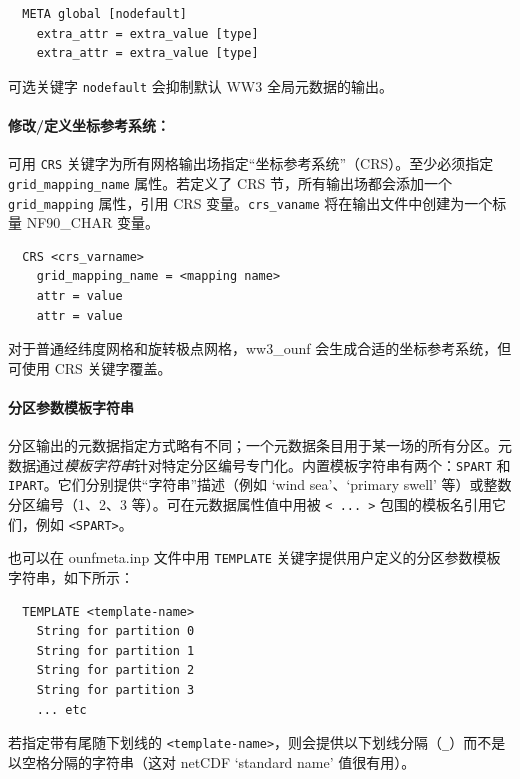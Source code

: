 \begin{verbatim}
  META global [nodefault]
    extra_attr = extra_value [type]
    extra_attr = extra_value [type]
\end{verbatim}

\noindent
可选关键字 \texttt{nodefault} 会抑制默认 WW3 全局元数据的输出。

\noindent
\paragraph{修改/定义坐标参考系统：}


\noindent
可用 \texttt{CRS} 关键字为所有网格输出场指定“坐标参考系统”（CRS）。至少必须指定 \texttt{grid\_mapping\_name} 属性。若定义了 CRS 节，所有输出场都会添加一个 \texttt{grid\_mapping} 属性，引用 CRS 变量。\texttt{crs\_vaname} 将在输出文件中创建为一个标量 NF90\_CHAR 变量。

\begin{verbatim}
  CRS <crs_varname>
    grid_mapping_name = <mapping name>
    attr = value
    attr = value
\end{verbatim}

\noindent
对于普通经纬度网格和旋转极点网格，ww3\_ounf 会生成合适的坐标参考系统，但可使用 CRS 关键字覆盖。


\noindent
\paragraph{分区参数模板字符串}

\noindent
分区输出的元数据指定方式略有不同；一个元数据条目用于某一场的所有分区。元数据通过\emph{模板字符串}针对特定分区编号专门化。内置模板字符串有两个：\texttt{SPART} 和 \texttt{IPART}。它们分别提供“字符串”描述（例如 `wind sea'、`primary swell' 等）或整数分区编号（1、2、3 等）。可在元数据属性值中用被 \texttt{< ... >} 包围的模板名引用它们，例如 \texttt{<SPART>}。

\noindent
也可以在 ounfmeta.inp 文件中用 \texttt{TEMPLATE} 关键字提供用户定义的分区参数模板字符串，如下所示：

\begin{verbatim}
  TEMPLATE <template-name>
    String for partition 0
    String for partition 1
    String for partition 2
    String for partition 3
    ... etc
\end{verbatim}

\noindent
若指定带有尾随下划线的 \texttt{<template-name>}，则会提供以下划线分隔（\texttt{\_}）而不是以空格分隔的字符串（这对 netCDF `standard name' 值很有用）。


